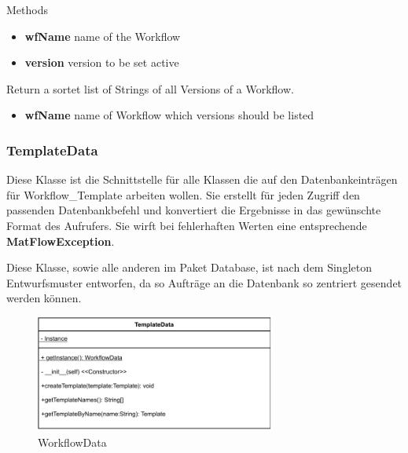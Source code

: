 \begin{methodenv}{Methods}
\begin{itemize}
	\item \textbf{wfName}
	name of the Workflow
	\item \textbf{version}
	version to be set active
\end{itemize}

Return a sortet list of Strings of all Versions of a Workflow.

\begin{itemize}
	\item \textbf{wfName}
	name of Workflow which versions should be listed
\end{itemize}

\end{methodenv}


\subsubsection{TemplateData}
Diese Klasse ist die Schnittstelle für alle Klassen die auf den Datenbankeinträgen für Workflow\_Template arbeiten wollen. Sie erstellt für jeden Zugriff den passenden Datenbankbefehl und konvertiert die Ergebnisse in das gewünschte Format des Aufrufers.
Sie wirft bei fehlerhaften Werten eine entsprechende \textbf{MatFlowException}.

Diese Klasse, sowie alle anderen im Paket Database, ist nach dem Singleton Entwurfsmuster entworfen, da so Aufträge an die Datenbank so zentriert gesendet werden können.
\begin{figure}[h]
	\centering
	\includegraphics[width=0.7\textwidth]{res/Klassen/TemplateData.pdf} 
	\caption{WorkflowData}
	\label{fig:workflowDataClass}
\end{figure}

